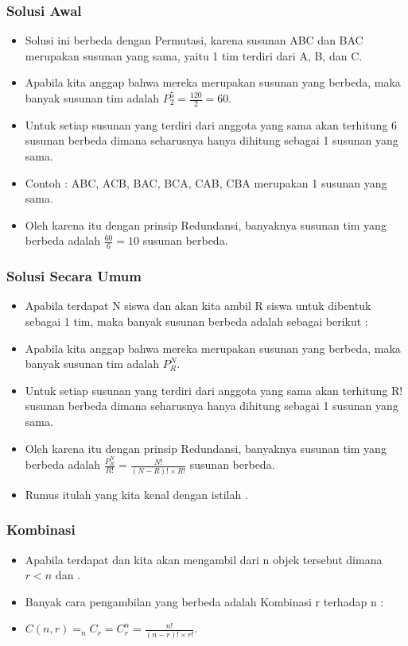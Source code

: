 \begin{frame}
\frametitle{Solusi Awal}
\begin{itemize}
  \item Solusi ini berbeda dengan Permutasi, karena susunan ABC dan BAC merupakan susunan yang sama, yaitu 1 tim terdiri dari A, B, dan C.
  \item Apabila kita anggap bahwa mereka merupakan susunan yang berbeda, maka banyak susunan tim adalah $P^{5}_{2} = \frac{120}{2} = 60$.
  \item Untuk setiap susunan yang terdiri dari anggota yang sama akan terhitung 6 susunan berbeda dimana seharusnya hanya dihitung sebagai 1 susunan yang sama.
  \item Contoh : ABC, ACB, BAC, BCA, CAB, CBA merupakan 1 susunan yang sama.
  \item Oleh karena itu dengan prinsip Redundansi, banyaknya susunan tim yang berbeda adalah $\frac{60}{6} = 10$ susunan berbeda.
\end{itemize}
\end{frame}

\begin{frame}
\frametitle{Solusi Secara Umum}
\begin{itemize}
  \item Apabila terdapat N siswa dan akan kita ambil R siswa untuk dibentuk sebagai 1 tim, maka banyak susunan berbeda adalah sebagai berikut :
  \item Apabila kita anggap bahwa mereka merupakan susunan yang berbeda, maka banyak susunan tim adalah $P^{N}_{R}$.
  \item Untuk setiap susunan yang terdiri dari anggota yang sama akan terhitung R! susunan berbeda dimana seharusnya hanya dihitung sebagai 1 susunan yang sama.
  \item Oleh karena itu dengan prinsip Redundansi, banyaknya susunan tim yang berbeda adalah $\frac{P^{N}_{R}}{R!} = \frac{N!}{(N-R)! \times R!}$ susunan berbeda.
  \item Rumus itulah yang kita kenal dengan istilah .
\end{itemize}
\end{frame}

\begin{frame}
\frametitle{Kombinasi}
\begin{itemize}
  \item Apabila terdapat  dan kita akan mengambil  dari n objek tersebut dimana $r<n$ dan .
  \item Banyak cara pengambilan yang berbeda adalah Kombinasi r terhadap n : 
  \item $C(n,r) = _{n}C_{r} = C^{n}_{r} = \frac{n!}{(n-r)! \times r!}$.
\end{itemize}
\end{frame}

